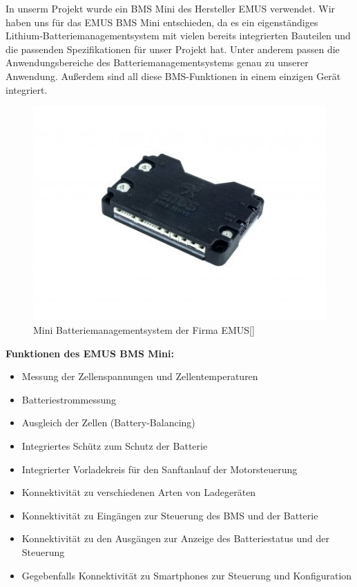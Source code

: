 In unserm Projekt wurde ein BMS Mini des Hersteller EMUS verwendet. Wir haben uns für das EMUS BMS Mini entschieden, da es ein eigenständiges Lithium-Batteriemanagementsystem mit vielen bereits integrierten Bauteilen und die passenden Spezifikationen für unser Projekt hat. Unter anderem passen die Anwendungsbereiche des Batteriemanagementsystems genau zu unserer Anwendung. Außerdem sind all diese BMS-Funktionen in einem einzigen Gerät integriert. 

\begin{figure}[H]
	\begin{center}
		\includegraphics[scale=0.9]{figures/Akku/BMSMINI.jpg}
		\caption{Mini Batteriemanagementsystem der Firma EMUS[\cite{EmusBmsMini}]}
		\label{fig: Mini Batteriemanagementsystem der Firma EMUS}
	\end{center}
\end{figure}

\textbf{Funktionen des EMUS BMS Mini:}
\begin{itemize}
\item {Messung der Zellenspannungen und Zellentemperaturen} 
\item {Batteriestrommessung}
\item {Ausgleich der Zellen (Battery-Balancing)}
\item {Integriertes Schütz zum Schutz der Batterie}
\item {Integrierter Vorladekreis für den Sanftanlauf der Motorsteuerung}
\item {Konnektivität zu verschiedenen Arten von Ladegeräten}
\item {Konnektivität zu Eingängen zur Steuerung des BMS und der Batterie}
\item {Konnektivität zu den Ausgängen zur Anzeige des Batteriestatus und der Steuerung}
\item {Gegebenfalls Konnektivität zu Smartphones zur Steuerung und Konfiguration}
\end{itemize}

